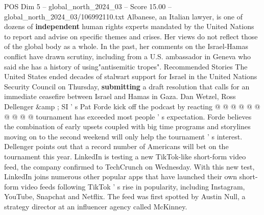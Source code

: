 \begin{textsample}{POS Dim 5 – global\_north\_2024\_03 – Score 15.00 – global\_north\_2024\_03/106992110.txt}
Albanese, an Italian lawyer, is one of dozens of \textbf{independent} human rights experts mandated by the United Nations to report and advise on specific themes and crises.
Her views do not reflect those of the global body as a whole.
In the past, her comments on the Israel-Hamas conflict have drawn scrutiny, including from a U.S. ambassador in Geneva who said she has a history of using"antisemitic tropes".
Recommended Stories The United States ended decades of stalwart support for Israel in the United Nations Security Council on Thursday, \textbf{submitting} a draft resolution that calls for an immediate ceasefire between Israel and Hamas in Gaza.
Dan Wetzel, Ross Dellenger \&amp ; SI ' s Pat Forde kick off the podcast by reacting @ @ @ @ @ @ @ @ @ @ tournament has exceeded most people ' s expectation.
Forde believes the combination of early upsets coupled with big time programs and storylines moving on to the second weekend will only help the tournament ' s interest.
Dellenger points out that a record number of Americans will bet on the tournament this year.
LinkedIn is testing a new TikTok-like short-form video feed, the company confirmed to TechCrunch on Wednesday.
With this new test, LinkedIn joins numerous other popular apps that have launched their own short-form video feeds following TikTok ' s rise in popularity, including Instagram, YouTube, Snapchat and Netflix.
The feed was first spotted by Austin Null, a strategy director at an influencer agency called McKinney.

\end{textsample}
